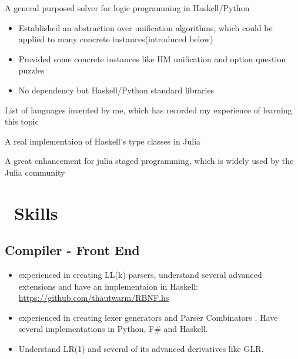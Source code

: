 \documentclass{resume}
\begin{document}
A general purposed solver for logic programming in Haskell/Python
\begin{itemize}
 \item Established an abstraction over unification algorithms, which could be applied to many concrete instances(introduced below)
 \item Provided some concrete instances like HM unification and option question puzzles
 \item No dependency but Haskell/Python standard libraries
\end{itemize}

List of languages invented by me, which has recorded my experience of learning this topic

A real implementaion of Haskell's type classes in Julia

A great enhancement for julia staged programming, which is widely used by the Julia community

\section{\faCogs\ Skills}

\subsection{\textbf{Compiler - Front End}}
\begin{itemize}
  \item experienced in creating LL(k) parsers, understand several advanced extensions and have an implementaion
        in Haskell: \url{https://github.com/thautwarm/RBNF.hs}
  \item experienced in creating lexer generators and Parser Combinators
        . Have several implementations in Python, F\# and Haskell.
  \item Understand LR(1) and several of its advanced derivatives like GLR.
\end{itemize}
\end{document}
